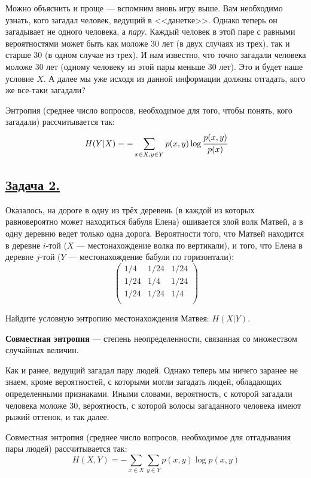 Можно объяснить и проще --- вспомним вновь игру выше. Вам необходимо узнать, кого загадал человек, ведущий в <<данетке>>. Однако теперь он загадывает не одного человека, а \textit{пару}. Каждый человек в этой паре с равными вероятностями может быть как моложе 30 лет (в двух случаях из трех), так и старше 30 (в одном случае из трех). И нам известно, что точно загадали человека моложе 30 лет (одному человеку из этой пары меньше 30 лет). Это и будет наше условие $X$. А далее мы уже исходя из данной информации должны отгадать, кого же все-таки загадали?

Энтропия (среднее число вопросов, необходимое для того, чтобы понять, кого загадали) рассчитывается так:
\[H(Y|X)=-\sum\limits_{x\in X, y\in Y} p(x, y)\log \cfrac{p(x, y)}{p(x)} \]

\subsection*{\hyperref[sec:sol_problem2]{Задача 2.}}\label{sec:problem2} Оказалось, на дороге в одну из трёх деревень (в каждой из которых равновероятно может находиться бабуля Елена) ошивается злой волк Матвей, а в одну деревню ведет только одна дорога. Вероятности того, что Матвей находится в деревне $i$-той ($X$ --- местонахождение волка по вертикали), и того, что Елена в деревне $j$-той ($Y$ --- местонахождение бабули по горизонтали):
\[\begin{pmatrix}
    1/4 & 1/24 & 1/24 \\
    1/24 & 1/4 & 1/24 \\
    1/24 & 1/24 & 1/4 \\
\end{pmatrix} \]

Найдите условную энтропию местонахождения Матвея: $H(X|Y)$. 
\\

\begin{siderules}
    \textbf{Совместная энтропия} --- степень неопределенности, связанная со множеством случайных величин.
\end{siderules}

Как и ранее, ведущий загадал пару людей. Однако теперь мы ничего заранее не знаем, кроме вероятностей, с которыми могли загадать людей, обладающих определенными признаками. Иными словами, вероятность, с которой загадали человека моложе 30, вероятность, с которой волосы загаданного человека имеют рыжий оттенок, и так далее.

Совместная энтропия (среднее число вопросов, необходимое для отгадывания пары людей) рассчитывается так:
\[H(X, Y)=-\sum\limits_{x\in X}\sum\limits_{y\in Y} p(x, y)\log p(x ,y) \]

